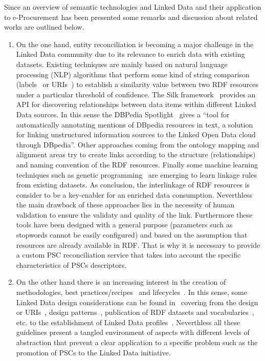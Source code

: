 Since an overview of semantic technologies and Linked Data and their application to e-Procurement has been presented 
some remarks and discussion about related works are outlined below.
 
 \begin{enumerate}
  \item  On the one hand, entity reconciliation is becoming a major challenge in the Linked Data community due to its relevance 
 to enrich data with existing datasets. Existing techniques are mainly based on natural language processing (NLP) algorithms 
 that perform some kind of string comparison (labels~\cite{Serimi} or URIs~\cite{Maali_Cyganiak_2011}) to establish a similarity 
 value between two RDF resources under a particular threshold of confidence. The Silk framework~\cite{DBLP:conf/semweb/JentzschIB10} 
 provides an API for discovering relationships between data items within different Linked Data sources. In this sense 
 the DBPedia Spotlight~\cite{DBLP:conf/i-semantics/MendesJGB11} gives a ``tool for automatically annotating mentions of DBpedia resources in text,
 a solution for linking unstructured information sources to the Linked Open Data cloud through DBpedia''. Other approaches 
 coming from the ontology mapping and alignment areas try to create links according to the structure (relationships) and naming convention 
 of the RDF resources. Finally some machine learning techniques such as genetic programming~\cite{DBLP:conf/semweb/IseleB11} are emerging 
 to learn linkage rules from existing datasets. As conclusion, the interlinkage of RDF resources is consider 
 to be a key-enabler for an enriched data consumption. Neverthless the main drawback of these approaches lies in the necessity of human validation 
 to ensure the validaty and quality of the link. Furthermore these tools have been designed with a general purpose (parameters such as stopwords cannot 
 be easily configured) and based on the assumption that resources are already available in RDF. That is why it is necessary 
 to provide a custom PSC reconciliation service that takes into account the specific characteristics of PSCs descriptors.
 
 \item On the other hand there is an increasing interest in the creation of methodologies, 
 best practices/recipes~\cite{best-gld,linked-data-cookbook} and lifecycles~\cite{gld-lifecycle,lod2-stack}. 
 In this sense, some Linked Data design considerations can be found in~\cite{bizer07how} covering from the design or URIs~\cite{Sauermann+2007a,bernerslee1998uri,uris-uk}, design patterns~\cite{linked-data-patterns}, 
 publication of RDF datasets and vocabularies~\cite{Berr08}, etc. to the establishment of Linked Data profiles~\cite{basic-profile-w3c}. Neverthless all these guidelines present 
 a tangled environment of aspects with different levels of abstraction that prevent a clear application to 
 a specific problem such as the promotion of PSCs to the Linked Data initiative.
 

\end{enumerate}
